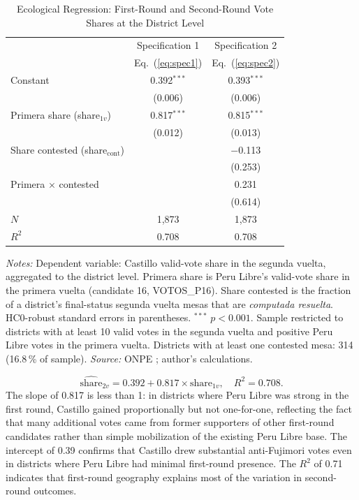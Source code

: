 \documentclass[12pt]{article}
\begin{document}
\begin{table}[H]
\centering
\caption{Ecological Regression: First-Round and Second-Round Vote Shares at the District Level}
\label{tab:regression}
\begin{tabular}{lcc}
\toprule
 & Specification 1 & Specification 2 \\
 & Eq.~(\ref{eq:spec1}) & Eq.~(\ref{eq:spec2}) \\
\midrule
Constant & 0.392$^{***}$ & 0.393$^{***}$ \\
         & (0.006) & (0.006) \\[4pt]
Primera share (share$_{1v}$) & 0.817$^{***}$ & 0.815$^{***}$ \\
                              & (0.012) & (0.013) \\[4pt]
Share contested (share$_{\text{cont}}$) & & $-$0.113 \\
                                         & & (0.253) \\[4pt]
Primera $\times$ contested & & 0.231 \\
                            & & (0.614) \\[4pt]
\midrule
$N$ & 1,873 & 1,873 \\
$R^2$ & 0.708 & 0.708 \\
\bottomrule
\end{tabular}
\vspace{0.2cm}
\begin{minipage}{\textwidth}
\footnotesize
\textit{Notes:} Dependent variable: Castillo valid-vote share in the segunda
vuelta, aggregated to the district level. Primera share is Peru Libre's
valid-vote share in the primera vuelta (candidate 16, VOTOS\_P16).
Share contested is the fraction of a district's final-status segunda vuelta
mesas that are \emph{computada resuelta}. HC0-robust standard errors
in parentheses. $^{***}$ $p < 0.001$.
Sample restricted to districts with at least 10 valid votes in the segunda
vuelta and positive Peru Libre votes in the primera vuelta. Districts with
at least one contested mesa: 314 (16.8\,\% of sample).
\textit{Source:} ONPE \citep{onpe2021, onpe2021a}; author's calculations.
\end{minipage}
\end{table}
\[
  \widehat{\text{share}}_{2v} = 0.392 + 0.817 \times \text{share}_{1v},
  \quad R^2 = 0.708.
\]
The slope of 0.817 is less than 1: in districts where Peru Libre was
strong in the first round, Castillo gained proportionally but not one-for-one,
reflecting the fact that many additional votes came from former supporters
of other first-round candidates rather than simple mobilization of the
existing Peru Libre base. The intercept of 0.39 confirms that Castillo
drew substantial anti-Fujimori votes even in districts where Peru Libre had
minimal first-round presence. The $R^2$ of 0.71 indicates that
first-round geography explains most of the variation in second-round outcomes.
\end{document}
